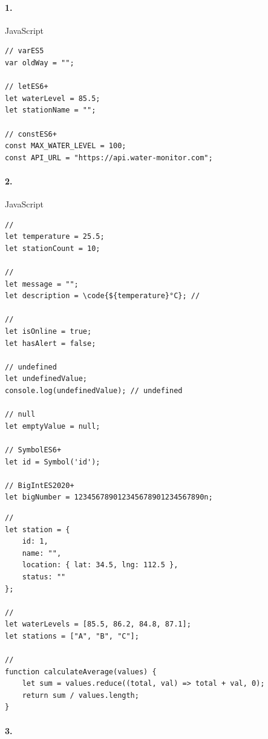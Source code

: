 \hypertarget{section-14}{%
\paragraph{1.}\label{section-14}}

JavaScript

\begin{lstlisting}[style=javascript]
// varES5
var oldWay = "";

// letES6+
let waterLevel = 85.5;
let stationName = "";

// constES6+
const MAX_WATER_LEVEL = 100;
const API_URL = "https://api.water-monitor.com";
\end{lstlisting}

\hypertarget{section-15}{%
\paragraph{2.}\label{section-15}}

JavaScript

\important{}
\begin{lstlisting}[style=javascript]
// 
let temperature = 25.5;
let stationCount = 10;

// 
let message = "";
let description = \code{${temperature}°C}; // 

// 
let isOnline = true;
let hasAlert = false;

// undefined
let undefinedValue;
console.log(undefinedValue); // undefined

// null
let emptyValue = null;

// SymbolES6+
let id = Symbol('id');

// BigIntES2020+
let bigNumber = 123456789012345678901234567890n;
\end{lstlisting}

\important{}
\begin{lstlisting}[style=javascript]
// 
let station = {
    id: 1,
    name: "",
    location: { lat: 34.5, lng: 112.5 },
    status: ""
};

// 
let waterLevels = [85.5, 86.2, 84.8, 87.1];
let stations = ["A", "B", "C"];

// 
function calculateAverage(values) {
    let sum = values.reduce((total, val) => total + val, 0);
    return sum / values.length;
}
\end{lstlisting}

\hypertarget{section-16}{%
\paragraph{3.}\label{section-16}}

